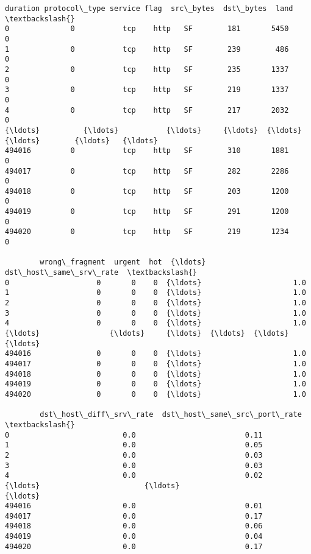 \documentclass[11pt]{article}
\makeatletter
\newcommand{\boxspacing}{\kern\kvtcb@left@rule\kern\kvtcb@boxsep}
\newcommand{\prompt}[4]{
        {\ttfamily\llap{{\color{#2}[#3]:\hspace{3pt}#4}}\vspace{-\baselineskip}}
    }
\makeatother
\begin{document}
            \begin{tcolorbox}[breakable, size=fbox, boxrule=.5pt, pad at break*=1mm, opacityfill=0]
\prompt{Out}{outcolor}{ }{\boxspacing}
\begin{Verbatim}[commandchars=\\\{\}]
        duration protocol\_type service flag  src\_bytes  dst\_bytes  land  \textbackslash{}
0              0           tcp    http   SF        181       5450     0
1              0           tcp    http   SF        239        486     0
2              0           tcp    http   SF        235       1337     0
3              0           tcp    http   SF        219       1337     0
4              0           tcp    http   SF        217       2032     0
{\ldots}          {\ldots}           {\ldots}     {\ldots}  {\ldots}        {\ldots}        {\ldots}   {\ldots}
494016         0           tcp    http   SF        310       1881     0
494017         0           tcp    http   SF        282       2286     0
494018         0           tcp    http   SF        203       1200     0
494019         0           tcp    http   SF        291       1200     0
494020         0           tcp    http   SF        219       1234     0

        wrong\_fragment  urgent  hot  {\ldots}  dst\_host\_same\_srv\_rate  \textbackslash{}
0                    0       0    0  {\ldots}                     1.0
1                    0       0    0  {\ldots}                     1.0
2                    0       0    0  {\ldots}                     1.0
3                    0       0    0  {\ldots}                     1.0
4                    0       0    0  {\ldots}                     1.0
{\ldots}                {\ldots}     {\ldots}  {\ldots}  {\ldots}                     {\ldots}
494016               0       0    0  {\ldots}                     1.0
494017               0       0    0  {\ldots}                     1.0
494018               0       0    0  {\ldots}                     1.0
494019               0       0    0  {\ldots}                     1.0
494020               0       0    0  {\ldots}                     1.0

        dst\_host\_diff\_srv\_rate  dst\_host\_same\_src\_port\_rate  \textbackslash{}
0                          0.0                         0.11
1                          0.0                         0.05
2                          0.0                         0.03
3                          0.0                         0.03
4                          0.0                         0.02
{\ldots}                        {\ldots}                          {\ldots}
494016                     0.0                         0.01
494017                     0.0                         0.17
494018                     0.0                         0.06
494019                     0.0                         0.04
494020                     0.0                         0.17


\end{Verbatim}
\end{tcolorbox}
\end{document}
